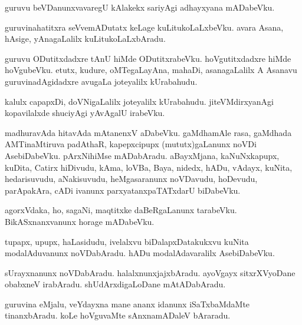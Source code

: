 \documentclass{article}
\begin{document}
\begin{mn}
guruvu beVDanunxvavaregU kAlakekx sariyAgi adhayxyana mADabeVku.
\end{mn}

\begin{mn}
guruvinahatitxra seVvemADutatx keLage kuLitukoLaLxbeVku. avara Asana, hAsige, yAnagaLalilx 
kuLitukoLaLxbAradu.
\end{mn}

\begin{mn}
guruvu ODutitxdadxre tAnU hiMde ODutitxrabeVku. hoVgutitxdadxre hiMde hoVgubeVku. etutx, kudure, 
oMTegaLayAna, mahaDi, asanagaLalilx A Asanavu guruvinadAgidadxre avugaLa joteyalilx kUrabahudu.
\end{mn}

\begin{mn}
kalulx capapxDi, doVNigaLalilx joteyalilx kUrabahudu. jiteVMdirxyanAgi kopavilalxde shuciyAgi 
yAvAgalU irabeVku.
\end{mn}

\begin{mn}
madhuravAda hitavAda mAtanenxV aDabeVku. gaMdhamAle rasa, gaMdhada AMTinaMtiruva padAthaR, 
kapepxcipupx (mututx)gaLanunx noVDi AsebiDabeVku. pArxNihiMse mADabAradu. aBayxMjana, 
kaNuNxkapupx, kuDita, Catirx hiDivudu, kAma, loVBa, Baya, nidedx, hADu, vAdayx, kuNita, 
hedarisuvudu, aNakisuvudu, heMgasaranunx noVDavudu, hoDevudu, parApakAra, cADi ivanunx 
parxyatanxpaTATxdarU biDabeVku.
\end{mn}

\begin{mn}
agorxVdaka, ho, sagaNi, maqtitxke daBeRgaLanunx tarabeVku. BikASxnanxvanunx horage mADabeVku.
\end{mn}

\begin{mn}
tupapx, upupx, haLasidudu, ivelalxvu biDalapxDatakukxvu kuNita modalAduvanunx noVDabAradu. hADu
modalAdavaralilx AsebiDabeVku.
\end{mn}

\begin{mn}
sUrayxnanunx noVDabAradu. halalxnunxjajxbAradu. ayoVgayx sitxrXVyoDane obabxneV irabAradu. 
shUdArxdigaLoDane mAtADabAradu.
\end{mn}

\begin{mn}
guruvina eMjalu, veYdayxna mane ananx idanunx iSaTxbaMdaMte tinanxbAradu. koLe hoVguvaMte 
sAnxnamADaleV bAraradu.
\end{mn}
\end{document}
